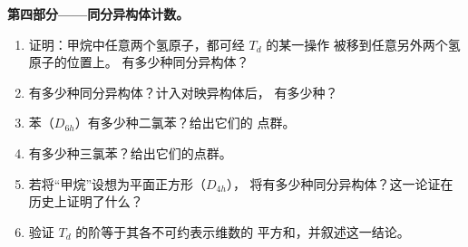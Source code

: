 \begin{problem}
\medskip\noindent\textbf{第四部分——同分异构体计数。}
\begin{enumerate}[resume]
  \item 证明：甲烷中任意两个氢原子，都可经 $T_d$ 的某一操作
        被移到任意另外两个氢原子的位置上。 有多少种同分异构体？
  \item {} 有多少种同分异构体？计入对映异构体后， 有多少种？
  \item 苯（$D_{6h}$）有多少种二氯苯？给出它们的
        点群。
  \item 有多少种三氯苯？给出它们的点群。
  \item 若将“甲烷”设想为平面正方形（$D_{4h}$），
         将有多少种同分异构体？这一论证在历史上证明了什么？
  \item 验证 $T_d$ 的阶等于其各不可约表示维数的
        平方和，并叙述这一结论。
\end{enumerate}
\end{problem}
